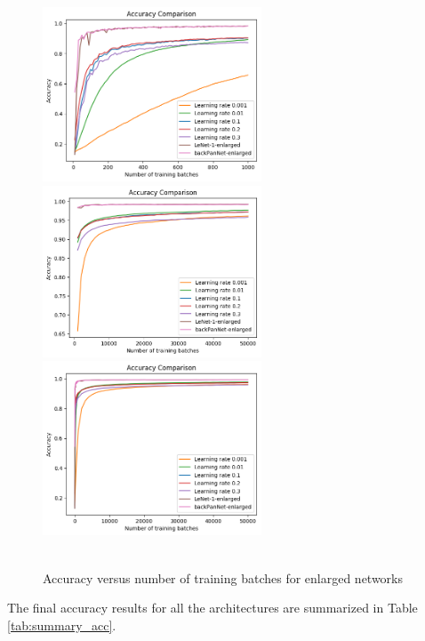\begin{figure}[th]
\centering
\includegraphics[width=65mm]{Figures/enlarged_net_accu_plot_combined_lr_1}
\includegraphics[width=65mm]{Figures/enlarged_net_accu_plot_combined_lr_2}
\includegraphics[width=65mm]{Figures/enlarged_net_accu_plot_combined_lr}
\decoRule
\caption{\\Accuracy versus number of training batches for enlarged networks}
\label{fig:enlarged_net_accu_plot_combined_lr}
\end{figure}



The final accuracy results for all the architectures are summarized in Table \ref{tab:summary_acc}.  

